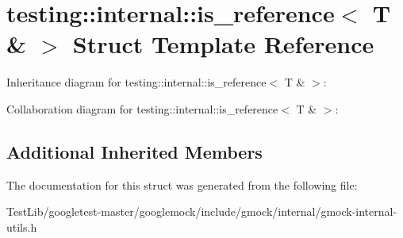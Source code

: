 \hypertarget{structtesting_1_1internal_1_1is__reference_3_01T_01_6_01_4}{}\section{testing\+:\+:internal\+:\+:is\+\_\+reference$<$ T \& $>$ Struct Template Reference}
\label{structtesting_1_1internal_1_1is__reference_3_01T_01_6_01_4}


Inheritance diagram for testing\+:\+:internal\+:\+:is\+\_\+reference$<$ T \& $>$\+:


Collaboration diagram for testing\+:\+:internal\+:\+:is\+\_\+reference$<$ T \& $>$\+:
\subsection*{Additional Inherited Members}


The documentation for this struct was generated from the following file\+:\begin{DoxyCompactItemize}
\item 
Test\+Lib/googletest-\/master/googlemock/include/gmock/internal/gmock-\/internal-\/utils.\+h\end{DoxyCompactItemize}
